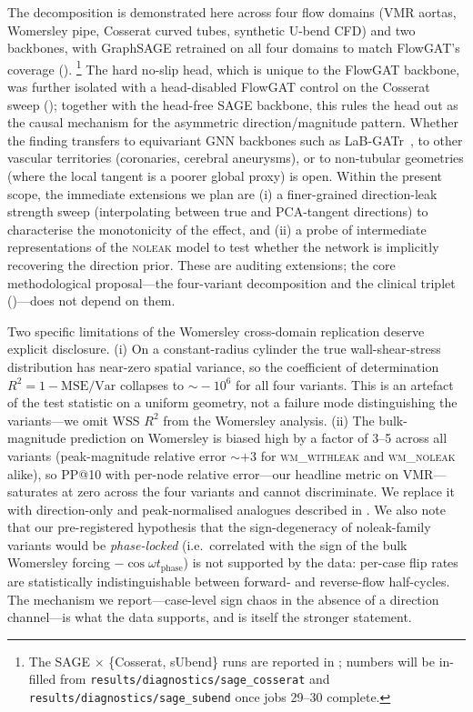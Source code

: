 \documentclass[10pt,a4paper]{article}
\newcommand{\noleak}{\textsc{noleak}}
\newcommand{\wmwith}{\textsc{wm\_withleak}}
\newcommand{\wmnoleak}{\textsc{wm\_noleak}}
\begin{document}
The decomposition is demonstrated here across four flow domains
(VMR aortas, Womersley pipe, Cosserat curved tubes, synthetic U-bend
CFD) and two backbones, with GraphSAGE retrained on all four
domains to match FlowGAT's coverage
().%
\footnote{The SAGE × \{Cosserat, sUbend\} runs are reported in
; numbers will be in-filled from
\texttt{results/diagnostics/sage\_cosserat} and
\texttt{results/diagnostics/sage\_subend} once jobs 29--30 complete.}
The hard no-slip head, which is unique to the FlowGAT backbone,
was further isolated with a head-disabled FlowGAT control on the
Cosserat sweep (); together with the
head-free SAGE backbone, this rules the head out as the causal
mechanism for the asymmetric direction/magnitude pattern. Whether
the finding transfers to equivariant GNN backbones such as
LaB-GATr~\cite{suk2024labgatr}, to other vascular territories
(coronaries, cerebral aneurysms), or to non-tubular geometries
(where the local tangent is a poorer global proxy) is open. Within
the present scope, the immediate extensions we plan are (i) a
finer-grained direction-leak strength sweep (interpolating between
true and PCA-tangent directions) to characterise the monotonicity of
the effect, and (ii) a probe of intermediate representations of the
\noleak{} model to test whether the network is implicitly recovering
the direction prior. These are auditing extensions; the core
methodological proposal---the four-variant decomposition and the
clinical triplet ()---does not depend on them.

Two specific limitations of the Womersley cross-domain replication
deserve explicit disclosure. (i) On a constant-radius cylinder the
true wall-shear-stress distribution has near-zero spatial variance,
so the coefficient of determination $R^2 = 1 - \mathrm{MSE}/\mathrm{Var}$
collapses to $\sim\!-10^6$ for all four variants. This is an artefact
of the test statistic on a uniform geometry, not a failure mode
distinguishing the variants---we omit WSS $R^2$ from the Womersley
analysis. (ii) The bulk-magnitude prediction on Womersley is biased
high by a factor of 3--5 across all variants
(peak-magnitude relative error $\sim+3$ for \wmwith{} and \wmnoleak{}
alike), so PP@10 with per-node relative error---our headline metric
on VMR---saturates at zero across the four variants and cannot
discriminate. We replace it with direction-only and
peak-normalised analogues described in
. We also note that our pre-registered
hypothesis that the sign-degeneracy of noleak-family variants would
be \emph{phase-locked} (i.e.\ correlated with the sign of the bulk
Womersley forcing $-\cos\omega t_\mathrm{phase}$) is not supported by
the data: per-case flip rates are statistically indistinguishable
between forward- and reverse-flow half-cycles. The mechanism we
report---case-level sign chaos in the absence of a direction
channel---is what the data supports, and is itself the stronger
statement.
\end{document}
